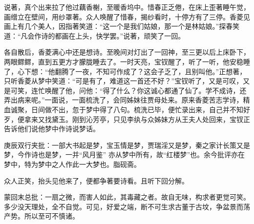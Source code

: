 \begin{parag}
    说著，真个出来拉了他过藕香榭，至暖香坞中。惜春正乏倦，在床上歪著睡午觉，画缯立在壁间，用纱罩著。众人唤醒了惜春，揭纱看时，十停方有了三停。香菱见画上有几个美人，因指著笑道：“这一个是我们姑娘，那一个是林姑娘。”探春笑道：“凡会作诗的都画在上头，快学罢。”说著，顽笑了一回。
\end{parag}


\begin{parag}
    各自散后，香菱满心中还是想诗。至晚间对灯出了一回神，至三更以后上床卧下，两眼鳏鳏，直到五更方才朦胧睡去了。一时天亮，宝钗醒了，听了一听，他安稳睡了，心下想：“他翻腾了一夜，不知可作成了？这会子乏了，且别叫他。”正想著，只听香菱从梦中笑道：“可是有了，难道这一首还不好？”宝钗听了，又是可叹，又是可笑，连忙唤醒了他，问他：“得了什么？你这诚心都通了仙了。学不成诗，还弄出病来呢。”一面说，一面梳洗了，会同姊妹往贾母处来。原来香菱苦志学诗，精血诚聚，日间做不出，忽于梦中得了八句。梳洗已毕，便忙录出来，自己并不知好歹，便拿来又找黛玉。刚到沁芳亭，只见李纨与众姊妹方从王夫人处回来，宝钗正告诉他们说他梦中作诗说梦话。\begin{note}庚辰双行夹批：一部大书起是梦，宝玉情是梦，贾瑞淫又是梦，秦之家计长策又是梦，今作诗也是梦，一并“风月鉴” 亦从梦中所有，故“红楼梦”也。余今批评亦在梦中，特为梦中之人作此一大梦也。脂砚斋。\end{note}众人正笑，抬头见他来了，便都争著要诗看。且听下回分解。
\end{parag}


\begin{parag}
    \begin{note}蒙回末总批：一扇之微，而害人如此，其毒藏之者。故自无味，构求者更觉可笑。多少没天理处，全不自觉。可见，好爱之端，断不可生求古董于古坟，争盆景而荡产势。所以至可不慎诸。\end{note}
\end{parag}

